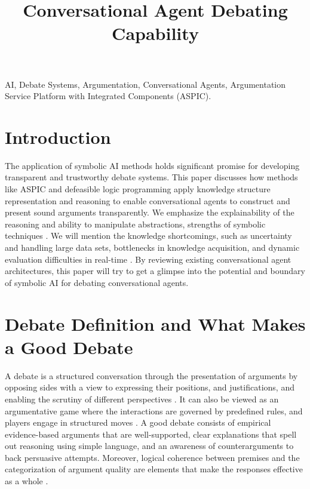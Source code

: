 \documentclass[conference]{IEEEtran}
\begin{document}
\title{Conversational Agent Debating Capability}

\author{
\and
{}
}

\maketitle

\begin{abstract}

\end{abstract}

\begin{IEEEkeywords}
AI, Debate Systems, Argumentation, Conversational Agents, Argumentation Service Platform with Integrated Components (ASPIC).
\end{IEEEkeywords}

\section{Introduction}
The application of symbolic AI methods holds significant promise for developing transparent and trustworthy debate systems. This paper discusses how methods like ASPIC and defeasible logic programming apply knowledge structure representation and reasoning to enable conversational agents to construct and present sound arguments transparently. We emphasize the explainability of the reasoning and ability to manipulate abstractions, strengths of symbolic techniques \cite{b8}. We will mention the knowledge shortcomings, such as uncertainty and handling large data sets, bottlenecks in knowledge acquisition, and dynamic evaluation difficulties in real-time \cite{b9}. By reviewing existing conversational agent architectures, this paper will try to get a glimpse into the potential and boundary of symbolic AI for debating conversational agents.

\section{Debate Definition and What Makes a Good Debate}
A debate is a structured conversation through the presentation of arguments by opposing sides with a view to expressing their positions, and justifications, and enabling the scrutiny of different perspectives \cite{b1}\cite{b2}. It can also be viewed as an argumentative game where the interactions are governed by predefined rules, and players engage in structured moves \cite{b6}. A good debate consists of empirical evidence-based arguments that are well-supported, clear explanations that spell out reasoning using simple language, and an awareness of counterarguments to back persuasive attempts. Moreover, logical coherence between premises and the categorization of argument quality are elements that make the responses effective as a whole \cite{b6}.
\end{document}
